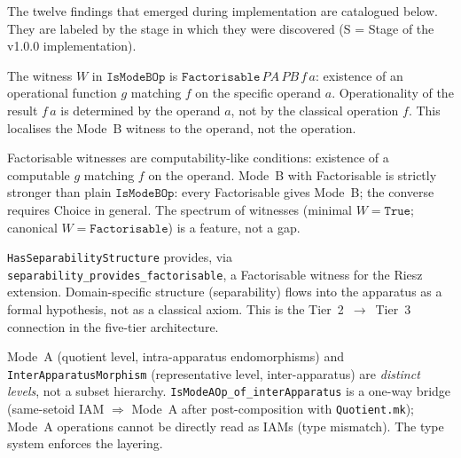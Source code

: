The twelve findings that emerged during implementation are catalogued below.
They are labeled by the stage in which they were discovered (S = Stage of
the v1.0.0 implementation).

\begin{finding}
\label{finding:S4A}
\leanok
{}
The witness $W$ in $\texttt{IsModeBOp}$ is $\texttt{Factorisable}\,PA\,PB\,f\,a$:
existence of an operational function $g$ matching $f$ on the specific
operand $a$.  Operationality of the result $f\,a$ is determined by the
operand $a$, not by the classical operation $f$.  This localises the
Mode~B witness to the operand, not the operation.
\end{finding}

\begin{finding}
\label{finding:S4B}
\leanok
{}
Factorisable witnesses are computability-like conditions: existence of a
computable $g$ matching $f$ on the operand.  Mode~B with Factorisable is
strictly stronger than plain $\texttt{IsModeBOp}$: every Factorisable
gives Mode~B; the converse requires Choice in general.  The spectrum of
witnesses (minimal $W = \texttt{True}$; canonical $W = \texttt{Factorisable}$)
is a feature, not a gap.
\end{finding}

\begin{finding}
\label{finding:S6A}
\leanok
{}
\texttt{HasSeparabilityStructure} provides, via
\texttt{separability\_provides\_factorisable}, a Factorisable witness for
the Riesz extension.  Domain-specific structure (separability) flows into
the apparatus as a formal hypothesis, not as a classical axiom.  This is
the Tier~2~$\to$~Tier~3 connection in the five-tier architecture.
\end{finding}

\begin{finding}
\label{finding:S2A}
\leanok
{}
Mode~A (quotient level, intra-apparatus endomorphisms) and
\texttt{InterApparatusMorphism} (representative level, inter-apparatus)
are \emph{distinct levels}, not a subset hierarchy.  \texttt{IsModeAOp\_of\_interApparatus}
is a one-way bridge (same-setoid IAM $\Rightarrow$ Mode~A after post-composition
with \texttt{Quotient.mk}); Mode~A operations cannot be directly read as IAMs
(type mismatch).  The type system enforces the layering.
\end{finding}

